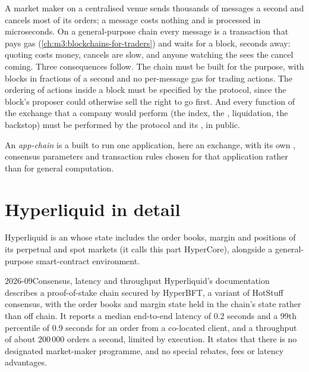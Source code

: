 A market maker on a centralised venue sends thousands of messages a second and cancels most of its orders;
a message costs nothing and is processed in microseconds. On a general-purpose chain every message is a
transaction that pays gas (\cref{ch:m3:blockchains-for-traders}) and waits for a block, seconds away: quoting
costs money, cancels are slow, and anyone watching the  sees the cancel coming. Three consequences
follow. The chain must be built for the purpose, with blocks in fractions of a second and no per-message gas
for trading actions. The ordering of actions inside a block must be specified by the protocol, since the
block's proposer could otherwise sell the right to go first. And every function of the exchange that a
company would perform (the index, the , liquidation, the backstop) must be performed by the
protocol and its , in public.

\begin{definition}\label{def:m3:on-chain-order-books-and-perpetual-dexs:appchain}
An \emph{app-chain} is a  built to run one application, here an exchange, with its
own , consensus parameters and transaction rules chosen for that application rather than for
general computation.
\end{definition}

\section{Hyperliquid in detail}

Hyperliquid is an  whose state includes the order books, margin and positions of its perpetual and
spot markets (it calls this part HyperCore), alongside a general-purpose smart-contract environment.

\begin{dated}{2026-09}{Consensus, latency and throughput}\label{dat:m3:on-chain-order-books-and-perpetual-dexs:hl}
Hyperliquid's documentation describes a proof-of-stake chain secured by HyperBFT, a variant of HotStuff consensus,
with the order books and margin state held in the chain's state rather than off chain. It reports a median
end-to-end latency of 0.2 seconds and a 99th percentile of 0.9 seconds for an order from a co-located client, and
a throughput of about 200\,000 orders a second, limited by execution. It states that there is no designated
market-maker programme, and no special rebates, fees or latency advantages.
\end{dated}

